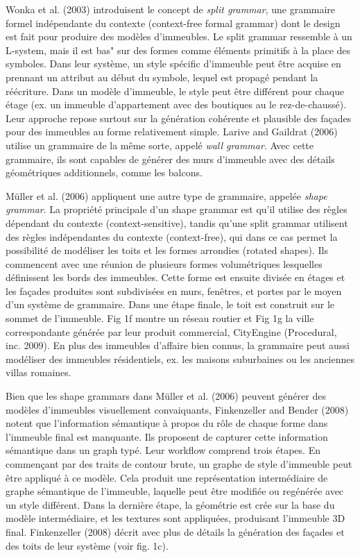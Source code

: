 \documentclass[11pt]{article}
\begin{document}
Wonka et al. (2003) introduisent le concept de \textit{split grammar}, une grammaire formel indépendante du contexte (context-free formal grammar) dont le design est fait pour produire des modèles d'immeubles. Le split grammar ressemble à un L-system, mais il est bas" sur des formes comme éléments primitifs à la place des symboles. Dans leur système, un style spécific d'immeuble peut être acquise en prennant un attribut au début du symbole, lequel est propagé pendant la réécriture. Dans un modèle d'immeuble, le style peut être différent pour chaque étage (ex. un immeuble d'appartement avec des boutiques au le rez-de-chaussé). Leur approche repose surtout sur la génération cohérente et plausible des façades pour des immeubles au forme relativement simple. Larive and Gaildrat (2006) utilise un grammaire de la même sorte, appelé \textit{wall grammar}. Avec cette grammaire, ils sont capables de générer des murs d'immeuble avec des détails géométriques additionnels, comme les balcons. \newline

Müller et al. (2006) appliquent une autre type de grammaire, appelée \textit{shape grammar}. La propriété principale d'un shape grammar est qu'il utilise des règles dépendant du contexte (context-sensitive), tandis qu'une split grammar utilisent des règles indépendantes du contexte (context-free), qui dans ce cas permet la possibilité de modéliser les toits et les formes arrondies (rotated shapes). Ils commencent avec une réunion de plusieurs formes volumétriques lesquelles définissent les bords des immeubles. Cette forme est ensuite divisée en étages et les façades produites sont subdivisées en murs, fenêtres, et portes par le moyen d'un système de grammaire. Dans une étape finale, le toit est construit sur le sommet de l'immeuble. Fig 1f montre un réseau routier et Fig 1g la ville correspondante générée par leur produit commercial, CityEngine (Procedural, inc. 2009). En plus des immeubles d'affaire bien connus, la grammaire peut aussi modéliser des immeubles résidentiels, ex. les maisons suburbaines ou les anciennes villas romaines. \newline

Bien que les shape grammars dans Müller et al. (2006) peuvent générer des modèles d'immeubles visuellement convaiquants, Finkenzeller and Bender (2008) notent que l'information sémantique à propos du rôle de chaque forme dans l'immeuble final est manquante. Ils proposent de capturer cette information sémantique dans un graph typé. Leur workflow comprend trois étapes. En commençant par des traits de contour brute, un graphe de style d'immeuble peut être appliqué à ce modèle. Cela produit une représentation intermédiaire de graphe sémantique de l'immeuble, laquelle peut être modifiée ou regénérée avec un style différent. Dans la dernière étape, la géométrie est crée sur la base du modèle intermédiaire, et les textures sont appliquées, produisant l'immeuble 3D final. Finkenzeller (2008) décrit avec plus de détails la génération des façades et des toits de leur système (voir fig. 1c). \newline
\end{document}

